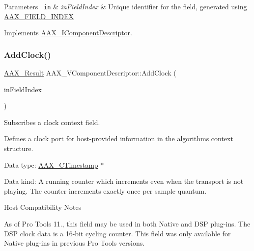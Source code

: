 \begin{DoxyParams}[1]{Parameters}
\mbox{\texttt{ in}}  & {\em in\+Field\+Index} & Unique identifier for the field, generated using \mbox{\hyperlink{a00392_acf807247ecd6e5899dc9dc31644e9a1d}{A\+A\+X\+\_\+\+F\+I\+E\+L\+D\+\_\+\+I\+N\+D\+EX}} \\
\hline
\end{DoxyParams}


Implements \mbox{\hyperlink{a01781_adbd57beaa0a3143d3cf44b93ecdb59ec}{A\+A\+X\+\_\+\+I\+Component\+Descriptor}}.

\mbox{\label{a01901_a4da0588e0e1fb6c1b74af10ac525a35e}} 
\subsubsection{\texorpdfstring{AddClock()}{AddClock()}}
{\footnotesize\ttfamily \mbox{\hyperlink{a00392_a4d8f69a697df7f70c3a8e9b8ee130d2f}{A\+A\+X\+\_\+\+Result}} A\+A\+X\+\_\+\+V\+Component\+Descriptor\+::\+Add\+Clock (\begin{DoxyParamCaption}\item[{\mbox{\hyperlink{a00392_ae807f8986143820cfb5d6da32165c9c7}{A\+A\+X\+\_\+\+C\+Field\+Index}}}]{in\+Field\+Index }\end{DoxyParamCaption})\hspace{0.3cm}{\ttfamily [virtual]}}



Subscribes a clock context field. 

Defines a clock port for host-\/provided information in the algorithm\textquotesingle{}s context structure.


\begin{DoxyItemize}
\item Data type\+: \mbox{\hyperlink{a00392_aae7325dbfa53a983f208a68cb563fba5}{A\+A\+X\+\_\+\+C\+Timestamp}} $\ast$
\item Data kind\+: A running counter which increments even when the transport is not playing. The counter increments exactly once per sample quantum.

\begin{DoxyRefDesc}{Host Compatibility Notes}
\item[\mbox{\hyperlink{a00786__compatibility_notes000054}{Host Compatibility Notes}}]As of Pro Tools 11., this field may be used in both Native and D\+SP plug-\/ins. The D\+SP clock data is a 16-\/bit cycling counter. This field was only available for Native plug-\/ins in previous Pro Tools versions.\end{DoxyRefDesc}

\end{DoxyItemize}


